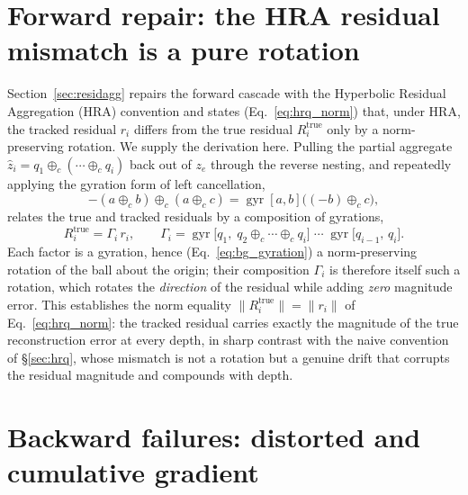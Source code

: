 \documentclass[12pt]{report}
\begin{document}
\section{Forward repair: the HRA residual mismatch is a pure rotation}
\label{app:hra_proof}
Section~\ref{sec:residagg} repairs the forward cascade with the Hyperbolic Residual Aggregation (HRA) convention and states (Eq.~\ref{eq:hrq_norm}) that, under HRA, the tracked residual $r_i$ differs from the true residual $R_i^{\text{true}}$ only by a norm-preserving rotation. We supply the derivation here. Pulling the partial aggregate $\hat z_i=q_1\oplus_c(\cdots\oplus_c q_i)$ back out of $z_e$ through the reverse nesting, and repeatedly applying the gyration form of left cancellation,
\begin{equation}
    \label{eq:left_cancel_gyr}
    -(a\oplus_c b)\oplus_c(a\oplus_c c)=\operatorname{gyr}[a,b]\big((-b)\oplus_c c\big),
\end{equation}
relates the true and tracked residuals by a composition of gyrations,
\begin{equation}
    \label{eq:hrq_gyration}
    R_i^{\text{true}} = \Gamma_i\, r_i,
    \qquad
    \Gamma_i = \operatorname{gyr}\!\big[q_1,\;q_2\oplus_c\cdots\oplus_c q_i\big]\;\cdots\;\operatorname{gyr}\!\big[q_{i-1},\,q_i\big].
\end{equation}
Each factor is a gyration, hence (Eq.~\ref{eq:bg_gyration}) a norm-preserving rotation of the ball about the origin; their composition $\Gamma_i$ is therefore itself such a rotation, which rotates the \emph{direction} of the residual while adding \emph{zero} magnitude error. This establishes the norm equality $\|R_i^{\text{true}}\| = \|r_i\|$ of Eq.~\ref{eq:hrq_norm}: the tracked residual carries exactly the magnitude of the true reconstruction error at every depth, in sharp contrast with the naive convention of \S\ref{sec:hrq}, whose mismatch is not a rotation but a genuine drift that corrupts the residual magnitude and compounds with depth.


\section{Backward failures: distorted and cumulative gradient}
\label{sec:firewall}
\end{document}
